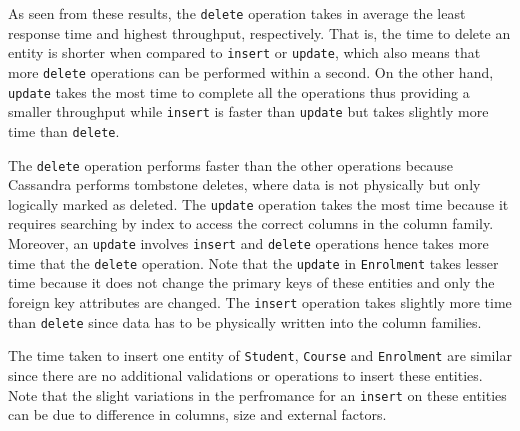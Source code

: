 As seen from these results,  the \texttt{delete} operation takes in average the
least response time and  highest throughput,  respectively.  That is,  the time to
delete an entity is shorter when compared to \texttt{insert} or \texttt{update}, 
which also means that more \texttt{delete} operations can be performed within a
second.  On the other hand,  \texttt{update} takes the most time to complete all
the operations thus providing a smaller throughput while \texttt{insert} is
faster than \texttt{update} but takes slightly more time than \texttt{delete}. 

The \texttt{delete} operation performs faster than the other operations because
Cassandra performs  tombstone deletes,  where data is not physically but only
logically marked as deleted.  The \texttt{update} operation takes the most time
because it requires searching by index to access the correct columns in the
column family.  Moreover,   an \texttt{update} involves  \texttt{insert} and
\texttt{delete} operations hence takes more time that the \texttt{delete}
operation. Note that the \texttt{update} in \texttt{Enrolment} takes lesser time
because it does not change the primary keys of these entities and only the
foreign key attributes are changed.  %
The \texttt{insert} operation takes slightly more time than \texttt{delete}
since data has to be physically written into the column families.

The time taken to insert one entity of \texttt{Student},  \texttt{Course} and
\texttt{Enrolment} are similar since there are no additional validations or
operations to insert these entities.  Note that the slight variations in the
perfromance for an \texttt{insert} on these entities can be due to
difference in columns,  size and external factors. 